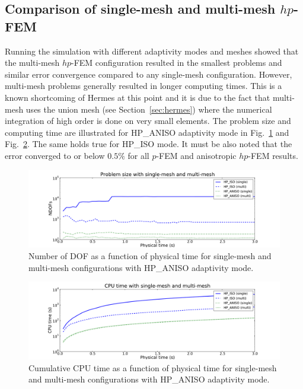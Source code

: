 \subsection{Comparison of single-mesh and multi-mesh $hp$-FEM}
Running the simulation with different adaptivity modes 
and meshes showed that the multi-mesh $hp$-FEM configuration resulted in
the smallest problems and similar error 
convergence compared to any single-mesh configuration. However,
multi-mesh problems generally resulted in longer computing times. This is a known
shortcoming of Hermes at this point and it is due to the fact that
multi-mesh uses the union mesh (see Section~\ref{sec:hermes}) where 
the numerical integration of high order is done on very small elements.
The problem size and computing time are illustrated for HP\_ANISO adaptivity mode in Fig.~\ref{fig:singlemultidof} and Fig.~\ref{fig:singlemulticpu}.
The same holds true for HP\_ISO mode.  It must be also noted that the error
converged to or below $0.5\%$ for all $p$-FEM and anisotropic $hp$-FEM results.
 
\begin{figure}[!ht]
  \begin{centering}
  \includegraphics[width=\columnwidth]{singlemulti_dof}
  \caption{\label{fig:singlemultidof} Number of DOF as a function 
  of physical time for single-mesh and multi-mesh configurations with 
  HP\_ANISO adaptivity mode.}
  \end{centering}
\end{figure}


\begin{figure}[!ht]
  \begin{centering}
  \includegraphics[width=\columnwidth]{singlemulti_cpu}
  \caption{\label{fig:singlemulticpu} Cumulative CPU time as a function 
  of physical time for single-mesh and multi-mesh configurations with 
  HP\_ANISO adaptivity mode.}
  \end{centering}
\end{figure}

